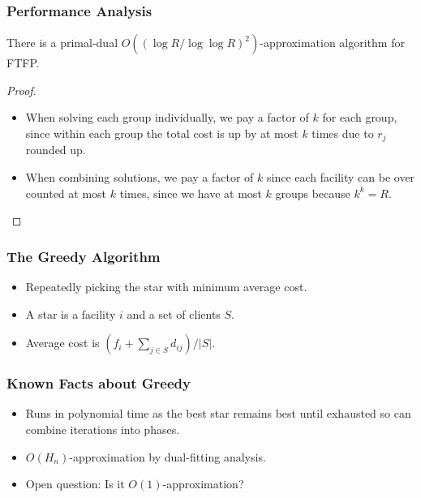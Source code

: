 \documentclass[hyperref, xcolor=dvipsnames]{beamer}
\begin{document}
\begin{frame}
  \frametitle{Performance Analysis}
  \begin{theorem}
    There is a primal-dual $O((\log R /\log\log R)^2)$-approximation
    algorithm for FTFP.
  \end{theorem}
  \begin{proof}
    \begin{itemize}
    \item When solving each group individually, we pay a factor of $k$
      for each group, since within each group the total cost is up by
      at most $k$ times due to $r_j$ rounded up.
    \item When combining solutions, we pay a factor of $k$ since each
      facility can be over counted at most $k$ times, since we have at
      most $k$ groups because $k^k = R$.
    \end{itemize}
  \end{proof}
\end{frame}

\begin{frame}
  \frametitle{The Greedy Algorithm}
  \begin{itemize}
  \item Repeatedly picking the star with minimum average cost.
  \item A star is a facility $i$ and a set of clients $S$.
  \item Average cost is $ (f_i + \sum_{j\in S} d_{ij}) / |S|$.
  \end{itemize}
\end{frame}

\begin{frame}
  \frametitle{Known Facts about Greedy}
  \begin{itemize}
  \item Runs in polynomial time as the best star remains best until
    exhausted so can combine iterations into phases.
  \item $O(H_n)$-approximation by dual-fitting analysis.
  \item Open question: Is it $O(1)$-approximation?
  \end{itemize}
\end{frame}
\end{document}
